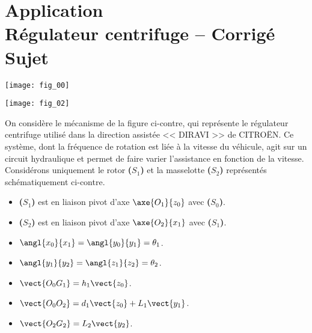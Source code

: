 \chapter*{Application  \\ 
Régulateur centrifuge -- \ifprof Corrigé \else Sujet \fi}

\iflivret {} \else
\ifprof  {} \else \fi
\fi

\setcounter{question}{0}
\begin{marginfigure}[4cm]
\texttt{[image: fig\_00]}
\end{marginfigure}


\begin{marginfigure}[10cm]
\texttt{[image: fig\_02]}
\end{marginfigure}

On considère le mécanisme de la figure ci-contre, qui représente le régulateur centrifuge utilisé dans la direction assistée << DIRAVI >> de CITROËN. Ce système, dont la fréquence de rotation est liée à la vitesse du véhicule, agit sur un circuit hydraulique et permet de faire varier l’assistance en fonction de la vitesse.
Considérons uniquement le rotor \textbf{($S_1$)} et la masselotte \textbf{($S_2$)} représentés schématiquement ci-contre.

\begin{multicols}{2}
\begin{itemize}
\item \textbf{($S_1$)} est en liaison pivot d'axe $\axe{O_1}{z_0}$ avec \textbf{($S_0$)}.
\item \textbf{($S_2$)} est en liaison pivot d'axe $\axe{O_2}{x_1}$ avec \textbf{($S_1$)}.
\item $\angl{x_0}{x_1} = \angl{y_0}{y_1}=\theta_1$.
\item $\angl{y_1}{y_2} = \angl{z_1}{z_2}=\theta_2$.
\item $\vect{O_0G_1}=h_1\vect{z_0}$.
\item $\vect{O_0O_2}=d_1\vect{z_0}+L_1\vect{y_1}$.
\item $\vect{O_2G_2}=L_2\vect{y_2}$.
\end{itemize}
\end{multicols}

